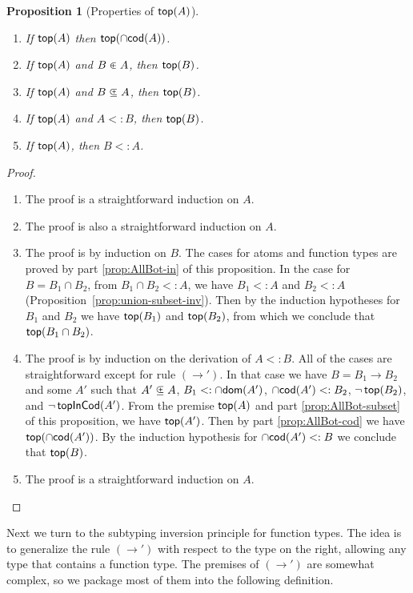 \documentclass{article}
\newtheorem{proposition}[theorem]{Proposition}
\begin{document}
\begin{proposition}[Properties of $\mathsf{top}(A)$]\ \label{prop:top}
  \begin{enumerate}
  \item If $\mathsf{top}(A)$ then $\mathsf{top}(\cap\mathsf{cod}(A))$.\label{prop:AllBot-cod}
  \item If $\mathsf{top}(A)$ and $B \inplus A$, then $\mathsf{top}(B)$.\label{prop:AllBot-in}
  \item If $\mathsf{top}(A)$ and $B \subsetpluseq A$, then $\mathsf{top}(B)$.\label{prop:AllBot-subset}
  \item If $\mathsf{top}(A)$ and $A <: B$, then $\mathsf{top}(B)$.\label{prop:AllBot-⊑}
  \item If $\mathsf{top}(A)$, then $B <: A$.\label{prop:AllBot-⊑-any}
  \end{enumerate}
\end{proposition}
\begin{proof}\
  \begin{enumerate}
  \item The proof is a straightforward induction on $A$.
  \item The proof is also a straightforward induction on $A$.
  \item The proof is by induction on $B$. The cases for atoms and
    function types are proved by part \ref{prop:AllBot-in} of
    this proposition. In the case for
    $B = B_1 \cap B_2$, from $B_1 \cap B_2 <: A$, we have
    $B_1 <: A$ and $B_2 <: A$ (Proposition~\ref{prop:union-subset-inv}).
    Then by the induction hypotheses for $B_1$ and $B_2$ we have
    $\mathsf{top}(B_1)$ and $\mathsf{top}(B_2)$, from which we conclude
    that $\mathsf{top}(B_1 \cap B_2)$.
  \item The proof is by induction on the derivation of $A <: B$.
    All of the cases are straightforward except for rule $(\to')$.
    In that case we have $B = B_1 \to B_2$ and some $A'$ such that
    $A' \subsetpluseq A$, $B_1 <: \cap\mathsf{dom}(A')$, $\cap\mathsf{cod}(A') <: B_2$, $\neg\,\mathsf{top}(B_2)$,
    and $\neg\,\mathsf{topInCod}(A')$. From the premise $\mathsf{top}(A)$
    and part \ref{prop:AllBot-subset} of this proposition, we
    have $\mathsf{top}(A')$. Then by part \ref{prop:AllBot-cod}
    we have $\mathsf{top}(\cap\mathsf{cod}(A'))$. By the induction hypothesis
    for $\cap\mathsf{cod}(A') <: B$ we conclude that $\mathsf{top}(B)$.
  \item The proof is a straightforward induction on $A$.
  \end{enumerate}
\end{proof}

Next we turn to the subtyping inversion principle for function types.
The idea is to generalize the rule $(\to')$ with respect to the type on
the right, allowing any type that contains a function type.  The
premises of $(\to')$ are somewhat complex, so we package most of them
into the following definition.
\end{document}

